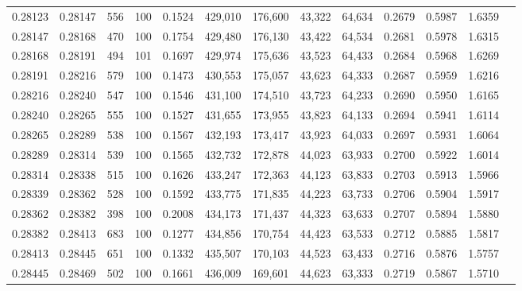 \begin{tabular}{rrrrrrrrrrrrr}
0.28123 & 0.28147 &   556 & 100 &                                     0.1524 & 429,010 & 176,600 &  43,322 &  64,634 & 0.2679 & 0.5987 & 1.6359 \\
0.28147 & 0.28168 &   470 & 100 &                                     0.1754 & 429,480 & 176,130 &  43,422 &  64,534 & 0.2681 & 0.5978 & 1.6315 \\
0.28168 & 0.28191 &   494 & 101 &                                     0.1697 & 429,974 & 175,636 &  43,523 &  64,433 & 0.2684 & 0.5968 & 1.6269 \\
0.28191 & 0.28216 &   579 & 100 &                                     0.1473 & 430,553 & 175,057 &  43,623 &  64,333 & 0.2687 & 0.5959 & 1.6216 \\
0.28216 & 0.28240 &   547 & 100 &                                     0.1546 & 431,100 & 174,510 &  43,723 &  64,233 & 0.2690 & 0.5950 & 1.6165 \\
0.28240 & 0.28265 &   555 & 100 &                                     0.1527 & 431,655 & 173,955 &  43,823 &  64,133 & 0.2694 & 0.5941 & 1.6114 \\
0.28265 & 0.28289 &   538 & 100 &                                     0.1567 & 432,193 & 173,417 &  43,923 &  64,033 & 0.2697 & 0.5931 & 1.6064 \\
0.28289 & 0.28314 &   539 & 100 &                                     0.1565 & 432,732 & 172,878 &  44,023 &  63,933 & 0.2700 & 0.5922 & 1.6014 \\
0.28314 & 0.28338 &   515 & 100 &                                     0.1626 & 433,247 & 172,363 &  44,123 &  63,833 & 0.2703 & 0.5913 & 1.5966 \\
0.28339 & 0.28362 &   528 & 100 &                                     0.1592 & 433,775 & 171,835 &  44,223 &  63,733 & 0.2706 & 0.5904 & 1.5917 \\
0.28362 & 0.28382 &   398 & 100 &                                     0.2008 & 434,173 & 171,437 &  44,323 &  63,633 & 0.2707 & 0.5894 & 1.5880 \\
0.28382 & 0.28413 &   683 & 100 &                                     0.1277 & 434,856 & 170,754 &  44,423 &  63,533 & 0.2712 & 0.5885 & 1.5817 \\
0.28413 & 0.28445 &   651 & 100 &                                     0.1332 & 435,507 & 170,103 &  44,523 &  63,433 & 0.2716 & 0.5876 & 1.5757 \\
0.28445 & 0.28469 &   502 & 100 &                                     0.1661 & 436,009 & 169,601 &  44,623 &  63,333 & 0.2719 & 0.5867 & 1.5710 \\

\end{tabular}
